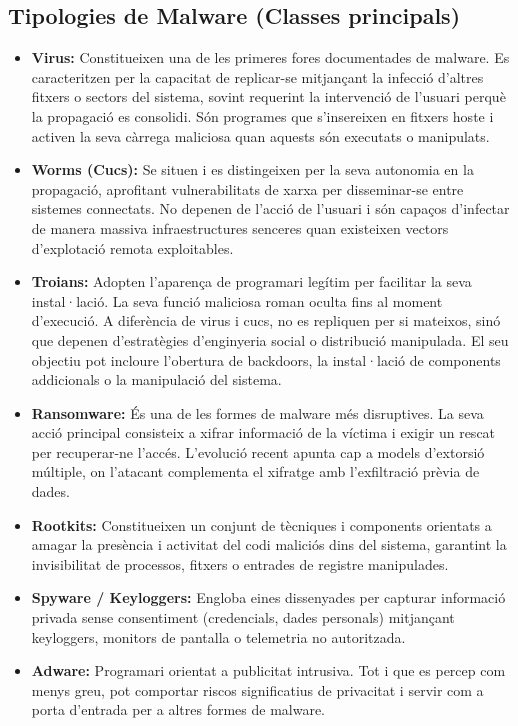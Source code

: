 \documentclass[12pt,a4paper]{report}
\begin{document}
\subsection{Tipologies de Malware (Classes principals)}
\begin{itemize}
    \item \textbf{Virus:} Constitueixen una de les primeres fores documentades de malware. Es caracteritzen per la capacitat de replicar-se mitjançant la infecció d'altres fitxers o sectors del sistema, sovint requerint la intervenció de l'usuari perquè la propagació es consolidi. Són programes que s'insereixen en fitxers hoste i activen la seva càrrega maliciosa quan aquests són executats o manipulats.
    \item \textbf{Worms (Cucs):} Se situen i es distingeixen per la seva autonomia en la propagació, aprofitant vulnerabilitats de xarxa per disseminar-se entre sistemes connectats. No depenen de l'acció de l'usuari i són capaços d'infectar de manera massiva infraestructures senceres quan existeixen vectors d'explotació remota exploitables.
    \item \textbf{Troians:} Adopten l'aparença de programari legítim per facilitar la seva instal·lació. La seva funció maliciosa roman oculta fins al moment d'execució. A diferència de virus i cucs, no es repliquen per si mateixos, sinó que depenen d'estratègies d'enginyeria social o distribució manipulada. El seu objectiu pot incloure l'obertura de backdoors, la instal·lació de components addicionals o la manipulació del sistema.
    \item \textbf{Ransomware:} És una de les formes de malware més disruptives. La seva acció principal consisteix a xifrar informació de la víctima i exigir un rescat per recuperar-ne l'accés. L'evolució recent apunta cap a models d'extorsió múltiple, on l'atacant complementa el xifratge amb l'exfiltració prèvia de dades.
    \item \textbf{Rootkits:} Constitueixen un conjunt de tècniques i components orientats a amagar la presència i activitat del codi maliciós dins del sistema, garantint la invisibilitat de processos, fitxers o entrades de registre manipulades.
    \item \textbf{Spyware / Keyloggers:} Engloba eines dissenyades per capturar informació privada sense consentiment (credencials, dades personals) mitjançant keyloggers, monitors de pantalla o telemetria no autoritzada.
    \item \textbf{Adware:} Programari orientat a publicitat intrusiva. Tot i que es percep com menys greu, pot comportar riscos significatius de privacitat i servir com a porta d'entrada per a altres formes de malware.
\end{itemize}
\end{document}
